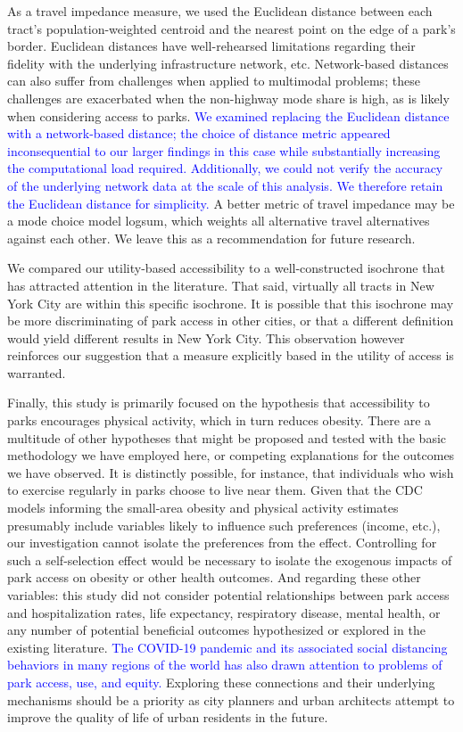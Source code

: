 \documentclass[shortAfour,sageh.bst]{sagej}
\begin{document}
As a travel impedance measure, we used the Euclidean distance between
each tract's population-weighted centroid and the nearest point on the
edge of a park's border. Euclidean distances have well-rehearsed
limitations regarding their fidelity with the underlying infrastructure
network, etc. Network-based distances can also suffer from challenges
when applied to multimodal problems; these challenges are exacerbated
when the non-highway mode share is high, as is likely when considering
access to parks. \textcolor{blue}{We examined replacing the Euclidean distance with a
network-based distance; the choice of distance metric appeared
inconsequential to our larger findings in this case while substantially
increasing the computational load required. Additionally, we could not
verify the accuracy of the underlying network data at the scale of this
analysis. We therefore retain the Euclidean distance for simplicity.} A
better metric of travel impedance may be a mode choice model logsum,
which weights all alternative travel alternatives against each other. We
leave this as a recommendation for future research.

We compared our utility-based accessibility to a well-constructed
isochrone that has attracted attention in the literature. That said,
virtually all tracts in New York City are within this specific
isochrone. It is possible that this isochrone may be more discriminating
of park access in other cities, or that a different definition would
yield different results in New York City. This observation however
reinforces our suggestion that a measure explicitly based in the utility
of access is warranted.

Finally, this study is primarily focused on the hypothesis that
accessibility to parks encourages physical activity, which in turn
reduces obesity. There are a multitude of other hypotheses that might be
proposed and tested with the basic methodology we have employed here, or
competing explanations for the outcomes we have observed. It is
distinctly possible, for instance, that individuals who wish to exercise
regularly in parks choose to live near them. Given that the CDC models
informing the small-area obesity and physical activity estimates
presumably include variables likely to influence such preferences
(income, etc.), our investigation cannot isolate the preferences from
the effect. Controlling for such a self-selection effect would be
necessary to isolate the exogenous impacts of park access on obesity or
other health outcomes. And regarding these other variables: this study
did not consider potential relationships between park access and
hospitalization rates, life expectancy, respiratory disease, mental
health, or any number of potential beneficial outcomes hypothesized or
explored in the existing literature. \textcolor{blue}{The COVID-19 pandemic and its
associated social distancing behaviors in many regions of the world has
also drawn attention to problems of park access, use, and equity.}
Exploring these connections and their underlying mechanisms should be a
priority as city planners and urban architects attempt to improve the
quality of life of urban residents in the future.
\end{document}

